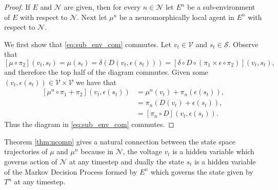 \documentclass{article} %
\numberwithin{equation}{subsection}
\numberwithin{theorem}{subsection}
\theoremstyle{named}
\def\scriptv{{\mathcal V}}
\def\scriptn{{\mathcal N}}
\def\scripts{{\mathcal S}}
\begin{document}
\begin{proof}
  If $E$ and $\scriptn$ are given, then for every $n \in \scriptn$ let $E^n$ be a sub-environment of $E$ with respect to $\scriptn$. Next let $\mu^n$ be a neuromorphically local agent in $E^n$ with respect to $\scriptn$.

  We first show that \eqref{eq:sub_env_com} commutes. Let $v_t \in \scriptv$ and $s_t \in \scripts$. Observe that
\begin{equation*}
\left[\mu \circ \pi_2\right](v_t, s_t) = \mu(s_t) = \delta\left(D(v_t, \epsilon(s_t))\right) = \left[\delta \circ D \circ (\pi_1 \times \epsilon\circ \pi_2)\right](v_t, s_t),
\end{equation*}
and therefore the top half of the diagram commutes. Given some $(v_t, \epsilon(s_t)) \in \scriptv \times \scriptv$ we have that 
\begin{equation*}
  \begin{aligned}
    \left[ \mu^n \circ \pi_1 + \pi_2\right] (v_t, \epsilon(s_t))  &= \mu^n(v_t) + \pi_n(\epsilon(s_t)),\\
     &= \pi_n\left(D(v_t) + \epsilon(s_t)\right), \\
     &= \left[\pi_n\circ D\right](v_t, \epsilon(s_t)). 
  \end{aligned}
\end{equation*}
Thus the diagram in \eqref{eq:sub_env_com} commutes. 
\end{proof}

Theorem \ref{thm:ncomp} gives a natural connection between the state space trajectories of $\mu$ and $\mu^n$ because in $\scriptn$, the voltage $v_t$ is a hidden variable which governs action of $\scriptn$ at any timestep and dually the state $s_t$ is a hidden variable of the Markov Decision Process formed by $E^n$ which governs the state given by $T^n$ at any timestep. 
\end{document}
